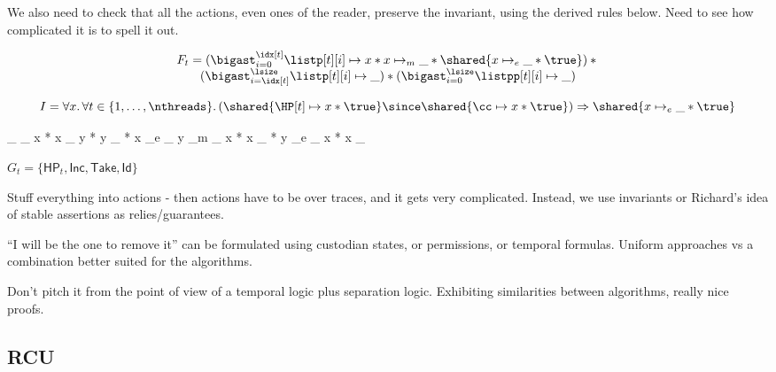 We also need to check that all the actions, even ones of the reader, preserve
the invariant, using the derived rules below. Need to see how complicated it is
to spell it out.


$$
\begin{array}{c}
F_t = 
(\bigast_{i=0}^{\idx[t]} \listp[t][i] \mapsto x * x \mapsto_m \_ * \shared{x
  \mapsto_e \_ * \true}) * {}\\
(\bigast_{i=\idx[t]}^{\lsize} \listp[t][i] \mapsto \_) * 
(\bigast_{i=0}^{\lsize} \listpp[t][i] \mapsto \_)
\end{array}
$$

$$
I = \forall x.\, \forall t \in \{1,\ldots,\nthreads\}.\,
(\shared{\HP[t] \mapsto x * \true} \since \shared{\cc \mapsto x * \true}) 
\Rightarrow \shared{x \mapsto_e \_* \true}
$$

\be
\HP[t] \mapsto \_ \leadsto \HP[t] \mapsto \_
\ee
\be
\cc \mapsto x * x \mapsto \_ \leadsto 
\cc \mapsto y * y \mapsto \_ * x \mapsto_e \_
\ee
\be
y \mapsto_m \_ \mid
\cc \mapsto x * x \mapsto \_ * y \mapsto_e \_
\leadsto
\cc \mapsto x * x \mapsto \_
\ee
\be
\emp
\leadsto
\emp
{}
\ee


$G_t = \{\textsf{HP}_t, \textsf{Inc}, \textsf{Take}, \textsf{Id}\}$


Stuff everything into actions - then actions have to be over traces, and it gets
very complicated. Instead, we use invariants or Richard's idea of stable
assertions as relies/guarantees.

``I will be the one to remove it'' can be formulated using custodian states, or
permissions, or temporal formulas. Uniform approaches vs a combination better
suited for the algorithms.

Don't pitch it from the point of view of a temporal logic plus separation
logic. Exhibiting similarities between algorithms, really nice proofs.

\subsection{RCU}

